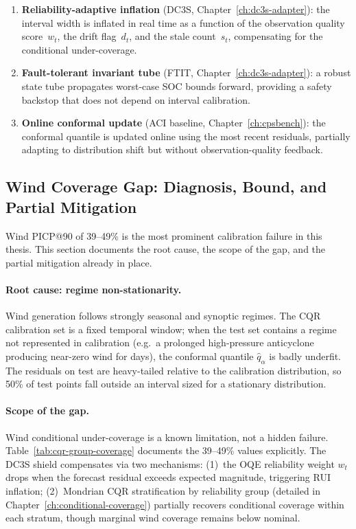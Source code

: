 \begin{enumerate}
  \item \textbf{Reliability-adaptive inflation} (DC3S, Chapter~\ref{ch:dc3s-adapter}):
    the interval width is inflated in real time as a function of the
    observation quality score~$w_t$, the drift flag~$d_t$, and the stale
    count~$s_t$, compensating for the conditional under-coverage.
  \item \textbf{Fault-tolerant invariant tube} (FTIT, Chapter~\ref{ch:dc3s-adapter}):
    a robust state tube propagates worst-case SOC bounds forward, providing
    a safety backstop that does not depend on interval calibration.
  \item \textbf{Online conformal update} (ACI baseline, Chapter~\ref{ch:cpsbench}):
    the conformal quantile is updated online using the most recent
    residuals, partially adapting to distribution shift but without
    observation-quality feedback.
\end{enumerate}

\subsection{Wind Coverage Gap: Diagnosis, Bound, and Partial Mitigation}
\label{sec:wind-gap}

Wind PICP@90 of 39--49\% is the most prominent calibration failure in this
thesis.  This section documents the root cause, the scope of the gap, and
the partial mitigation already in place.

\paragraph{Root cause: regime non-stationarity.}
Wind generation follows strongly seasonal and synoptic regimes.  The CQR
calibration set is a fixed temporal window; when the test set contains a
regime not represented in calibration (e.g.\ a prolonged high-pressure
anticyclone producing near-zero wind for days), the conformal quantile
$\hat{q}_\alpha$ is badly underfit.  The residuals on test are heavy-tailed
relative to the calibration distribution, so 50\% of test points fall
outside an interval sized for a stationary distribution.

\paragraph{Scope of the gap.}
Wind conditional under-coverage is a known limitation, not a hidden failure.
Table~\ref{tab:cqr-group-coverage} documents the 39--49\% values explicitly.
The DC3S shield compensates via two mechanisms: (1)~the OQE reliability
weight $w_t$ drops when the forecast residual exceeds expected magnitude,
triggering RUI inflation; (2)~Mondrian CQR stratification by reliability
group (detailed in Chapter~\ref{ch:conditional-coverage}) partially recovers
conditional coverage within each stratum, though marginal wind coverage
remains below nominal.

